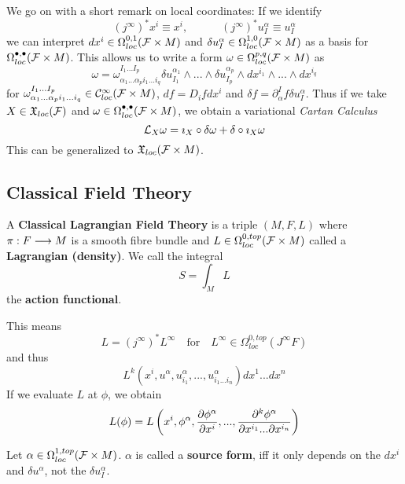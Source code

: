 We go on with a short remark on local coordinates: If we identify
$$ (j^\infty)^* x^i \equiv x^i, \quad \quad \quad (j^\infty)^* u^\alpha_I \equiv u^\alpha_I $$
we can interpret $dx^i \in \Omega^{0,1}_{loc}({\mathcal{F}}\times M)$ and $\delta u^\alpha_I \in \Omega^{1,0}_{loc}({\mathcal{F}}\times M)$ as a basis for $\Omega^{\bullet, \bullet}_{loc}({\mathcal{F}}\times M)$. This allows us to write a form $\omega \in \Omega^{p,q}_{loc}({\mathcal{F}}\times M)$ as
$$ \omega = \omega^{I_1 ... I_p}_{\alpha_1 ... \alpha_p i_1 ... i_q} \delta u^{\alpha_1}_{I_1}\wedge ... \wedge \delta u^{\alpha_p}_{I_p} \wedge dx^{i_1} \wedge ... \wedge dx^{i_q}  $$
for $\omega^{I_1 ... I_p}_{\alpha_1 ... \alpha_p i_1 ... i_q} \in \mathcal{C}^{\infty}_{loc}({\mathcal{F}}\times M)$, $df = D_i f dx^i$ and $\delta f = \partial^I_\alpha f \delta u^\alpha_I$. Thus if we take $X\in \mathfrak{X}_{loc}({\mathcal{F}})$ and $\omega \in \Omega^{\bullet,\bullet}_{loc}({\mathcal{F}}\times M)$, we obtain a variational \emph{Cartan Calculus}
$$ \mathcal{L}_{X} \omega = \imath_X \circ \delta \omega + \delta \circ \imath_X \omega $$
This can be generalized to $\mathfrak{X}_{loc}({\mathcal{F}}\times M)$.


\newpage
\subsection{Classical Field Theory}
\label{subsec:Classical_field_theory}

\begin{definition}
   A \textbf{Classical Lagrangian Field Theory} is a triple $(M, F, L)$ where $\pi:F\longrightarrow M$ is a smooth fibre bundle and $L \in \Omega^{0, top}_{loc}({\mathcal{F}} \times M)$ called a \textbf{Lagrangian (density)}. We call the integral
   $$ S = \int_M L $$
   the \textbf{action functional}.
\end{definition}

This means
$$ L = (j^\infty)^* L^\infty \quad \text{for} \quad L^\infty \in \Omega^{0, top}_{loc}(J^\infty F) $$
and thus
$$ L^k \left(x^i, u^\alpha, u^\alpha_{i_1}, ..., u^\alpha_{i_1 ...i_n} \right) dx^1 ... dx^n$$
If we evaluate $L$ at $\phi$, we obtain
$$ L(\phi) = L\left(x^i, \phi^\alpha, \dell{\phi^\alpha}{x^i}, ..., \dell{^k \phi^\alpha}{x^{i_1} ... \partial x^{i_n}}\right) $$

\begin{definition}
  Let $\alpha \in \Omega^{1,top}_{loc}({\mathcal{F}} \times M)$. $\alpha$ is called a \textbf{source form}, iff it only depends on the $dx^i$ and $\delta u^\alpha$, not the $\delta u^\alpha_I$.
\end{definition}

